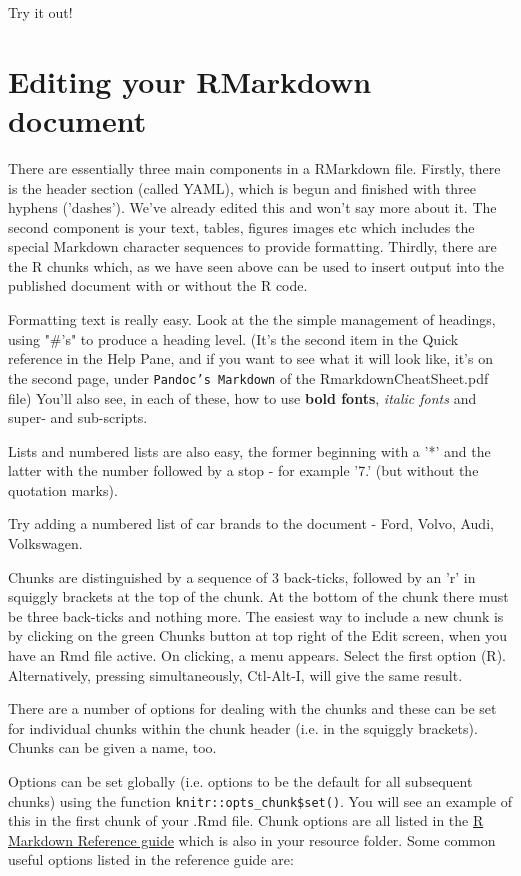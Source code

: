 \documentclass[titlepage]{book}\usepackage{knitr}
\begin{document}
Try it out!

\section{Editing your RMarkdown document}

There are essentially three main components in a RMarkdown file.  Firstly, there is the header section (called YAML), which is begun and finished with three hyphens ('dashes'). We've already edited this and won't say more about it.  The second component is your text, tables, figures images etc which includes the special Markdown character sequences to provide formatting. Thirdly, there are the R chunks which, as we have seen above can be used to insert output into the published document with or without the R code. 

Formatting text is really easy. Look at the the simple management of headings, using "\#'s" to produce a heading level.  (It's the second item in the Quick reference in the Help Pane, and if you want to see what it will look like, it's on the second page, under \texttt{Pandoc's Markdown} of the RmarkdownCheatSheet.pdf file)  You'll also see, in each of these, how to use \textbf{bold fonts}, \emph{italic fonts} and super- and sub-scripts.

Lists and numbered lists are also easy, the former beginning with a '*' and the latter with the number followed by a stop - for example '7.' (but without the quotation marks).

Try adding a numbered list of car brands to the document - Ford, Volvo, Audi, Volkswagen.

Chunks are distinguished by a sequence of 3 back-ticks, followed by an 'r' in squiggly brackets at the top of the chunk.  At the bottom of the chunk there must be three back-ticks and nothing more. The easiest way to include a new chunk is by clicking on the green Chunks button at top right of the Edit screen, when you have an Rmd file active. On clicking, a menu appears. Select the first option (R). Alternatively, pressing simultaneously, Ctl-Alt-I, will give the same result.

There are a number of options for dealing with the chunks and these can be set for individual chunks within the chunk header (i.e. in the squiggly brackets). Chunks can be given a name, too. 

Options can be set globally (i.e. options to be the default for all subsequent chunks) using the function \texttt{knitr::opts\_chunk\$set()}. You will see an example of this in the first chunk of your .Rmd file. Chunk options are all listed in the \href{https://www.rstudio.com/wp-content/uploads/2015/03/rmarkdown-reference.pdf}{R Markdown Reference guide} which is also in your resource folder.  Some common useful options listed in the reference guide are:
\end{document}
